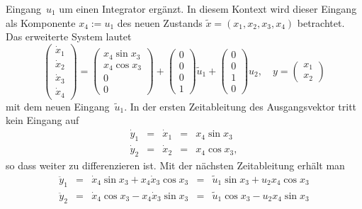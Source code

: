 \begin{example}
Eingang~$u_{1}$ um einen Integrator ergänzt. In diesem Kontext wird
dieser Eingang als Komponente $x_{4}:=u_{1}$ des neuen Zustands $\tilde{x}=(x_{1},x_{2},x_{3},x_{4})$
betrachtet. Das erweiterte System lautet 
\begin{equation}
\left(\begin{array}{c}
\dot{x}_{1}\\
\dot{x}_{2}\\
\dot{x}_{3}\\
\dot{x}_{4}
\end{array}\right)=\left(\begin{array}{c}
x_{4}\sin x_{3}\\
x_{4}\cos x_{3}\\
0\\
0
\end{array}\right)+\left(\begin{array}{c}
0\\
0\\
0\\
1
\end{array}\right)\tilde{u}_{1}+\left(\begin{array}{c}
0\\
0\\
1\\
0
\end{array}\right)u_{2},\quad y=\left(\begin{array}{c}
x_{1}\\
x_{2}
\end{array}\right)\label{eq:mobiler-roboter-erweitertes-system}
\end{equation}
mit dem neuen Eingang~$\tilde{u}_{1}$. In der ersten Zeitableitung
des Ausgangsvektor tritt kein Eingang auf
\begin{equation}
\begin{array}{lclcc}
\dot{y}_{1} & = & \dot{x}_{1} & = & x_{4}\sin x_{3}\\
\dot{y}_{2} & = & \dot{x}_{2} & = & x_{4}\cos x_{3},
\end{array}\label{eq:roboter-dy-mimo}
\end{equation}
so dass weiter zu differenzieren ist. Mit der nächsten Zeitableitung
erhält man 
\[
\begin{array}{lclcc}
\ddot{y}_{1} & = & \dot{x}_{4}\sin x_{3}+x_{4}\dot{x}_{3}\cos x_{3} & = & \tilde{u}_{1}\sin x_{3}+u_{2}x_{4}\cos x_{3}\\
\ddot{y}_{2} & = & \dot{x}_{4}\cos x_{3}-x_{4}\dot{x}_{3}\sin x_{3} & = & \tilde{u}_{1}\cos x_{3}-u_{2}x_{4}\sin x_{3}
\end{array}
\]
\end{example}
